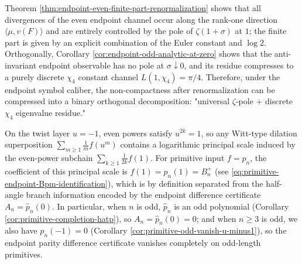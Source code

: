 \begin{remark}\label{rem:endpoint-renormalization-universal-pole-discrete-hair}
Theorem \ref{thm:endpoint-even-finite-part-renormalization} shows that all divergences of the even endpoint channel occur along the rank-one direction
\(\langle\mu,v(F)\rangle\) and are entirely controlled by the pole of \(\zeta(1+\sigma)\) at \(1\);
the finite part is given by an explicit combination of the Euler constant and \(\log 2\).
Orthogonally, Corollary \ref{cor:endpoint-odd-analytic-at-zero} shows that the anti-invariant endpoint observable has no pole at \(\sigma\downarrow 0\), and its residue compresses to a purely discrete \(\chi_4\) constant channel \(L(1,\chi_4)=\pi/4\).
Therefore, under the endpoint symbol caliber, the non-compactness after renormalization can be compressed into a binary orthogonal decomposition: "universal \(\zeta\)-pole + discrete \(\chi_4\) eigenvalue residue."
\end{remark}

\begin{remark}[Endpoint Logarithmic Principal Scale and Phase Precision Decoupling: Counting Control of the Even Power Channel at \texorpdfstring{$u=-1$}{u=-1}]\label{rem:endpoint-logscale-parity-decouple}
On the twist layer \(u=-1\), even powers satisfy \(u^{2k}=1\), so any Witt-type dilation superposition
\(
\sum_{m\ge 1}\frac1m f(u^m)
\)
contains a logarithmic principal scale induced by the even-power subchain \(\sum_{k\ge 1}\frac{1}{2k}f(1)\).
For primitive input \(f=p_n\), the coefficient of this principal scale is
\(
f(1)=p_n(1)=B_n^{+}
\)
(see \eqref{eq:primitive-endpoint-Bpm-identification}), which is by definition separated from the half-angle branch information encoded by the endpoint difference certificate
\(
A_n=\widehat p_n(0)
\).
In particular, when \(n\) is odd, \(\widehat p_n\) is an odd polynomial (Corollary \ref{cor:primitive-completion-hatp}), so \(A_n=\widehat p_n(0)=0\); and when \(n\ge 3\) is odd, we also have \(p_n(-1)=0\) (Corollary \ref{cor:primitive-odd-vanish-u-minus1}), so the endpoint parity difference certificate vanishes completely on odd-length primitives.
\end{remark}

